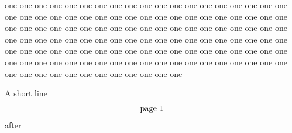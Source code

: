 \documentclass{article}
\begin{document}
one one one one one one one one one one one one one one one one one one
one one one one one one one one one one one one one one one one one one
one one one one one one one one one one one one one one one one one one
one one one one one one one one one one one one one one one one one one
one one one one one one one one one one one one one one one one one one
one one one one one one one one one one one one one one one one one one
one one one one one one one one one one one one one one one one one one

A short line
\[ \typeout{D=\thepage} \mbox{page \thepage} \]
after 
\end{document}
